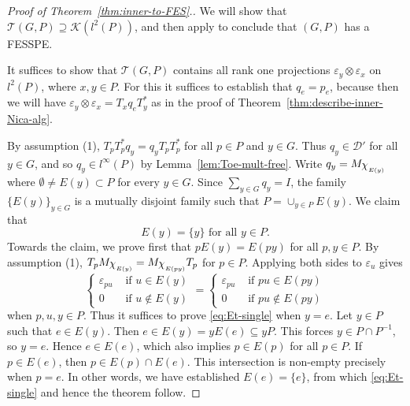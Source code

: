 \documentclass[12pt]{amsart}
\theoremstyle{plain}
\theoremstyle{remark}
\theoremstyle{definition}
\numberwithin{equation}{section}
\theoremstyle{plain}
\theoremstyle{definition}
\theoremstyle{remark}
\begin{document}
\begin{proof}[Proof of Theorem~\ref{thm:inner-to-FES}.]
We  will
show that ${\mathcal T}(G, P)\supseteq {\mathcal K}(l^2(P))$, and then apply \cite[Proposition 6.3]{N} to
conclude that $(G, P)$ has a {FESSPE}.

It suffices to show that ${\mathcal T}(G, P)$ contains all rank one projections $\varepsilon_y\otimes
\varepsilon_x$  on $l^2(P)$, where $x,y\in P$.  For this it suffices to establish that $q_e=p_e$,
because then we will have $\varepsilon_y\otimes\varepsilon_x=T_xq_eT_y^*$ as in the proof of Theorem~\ref{thm:describe-inner-Nica-alg}.

By assumption (1), $T_pT_p^*q_y=q_yT_pT_p^*$ for all $p\in P$ and  $y\in G$. Thus  $q_y\in{\mathcal D}'$ for all $y\in G$, and so
$q_y\in l^\infty(P)$ by Lemma~\ref{lem:Toe-mult-free}. Write $q_y=M_{{\raisebox{2pt}{\ensuremath{\chi}}}_{E(y)}}$  where $\emptyset\neq E(y)\subset P$ for every $y\in G$.
Since $\sum_{y\in G}q_y=I$, the family $\{E(y)\}_{y\in G}$ is a mutually disjoint family such that $P=\cup_{y\in P}E(y)$. We claim that
\begin{equation}\label{eq:Et-single}
E(y)=\{y\} \text{ for all }y\in P.
\end{equation}
Towards the claim, we prove first that $pE(y)=E(py)$ for all $p, y\in P$. By assumption (1), $T_pM_{{\raisebox{2pt}{\ensuremath{\chi}}}_{E(y)}}=M_{{\raisebox{2pt}{\ensuremath{\chi}}}_{E(py)}}T_p$
for $p\in P$. Applying both sides to $\varepsilon_u$ gives
$$
\begin{cases}\varepsilon_{pu}&\text{ if }u\in E(y)\\
0&\text{ if }u \notin E(y)\end{cases}=\begin{cases} \varepsilon_{pu}&\text{ if }pu\in E(py)\\
0&\text{ if }pu\notin E(py)
\end{cases}
$$
when $p,u, y\in P$. Thus it suffices to prove \eqref{eq:Et-single} when $y=e$. Let
$y\in P$ such that $e\in E(y)$. Then $e\in E(y)=yE(e)\subseteq yP$. This forces $y\in P\cap P^{-1}$, so $y=e$. Hence $e\in E(e)$,
which also implies $p\in E(p)$ for all $p\in P$.
If $p\in E(e)$, then $p\in E(p)\cap E(e)$. This intersection
is non-empty precisely when $p=e$. In other words, we have established $E(e)=\{e\}$, from
which \eqref{eq:Et-single} and hence the theorem follow.
 \end{proof}
\end{document}
